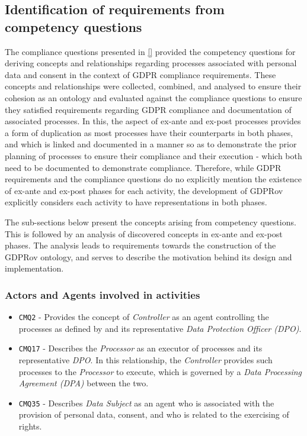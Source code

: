 \subsection{Identification of requirements from competency questions}\label{sec:gdprov:cq}
The compliance questions presented in \autoref{} provided the competency questions for deriving concepts and relationships regarding processes associated with personal data and consent in the context of GDPR compliance requirements. 
These concepts and relationships were collected, combined, and analysed to ensure their cohesion as an ontology and evaluated against the compliance questions to ensure they satisfied requirements regarding GDPR compliance and documentation of associated processes.
In this, the aspect of ex-ante and ex-post processes provides a form of duplication as most processes have their counterparts in both phases, and which is linked and documented in a manner so as to demonstrate the prior planning of processes to ensure their compliance and their execution - which both need to be documented to demonstrate compliance.
Therefore, while GDPR requirements and the compliance questions do no explicitly mention the existence of ex-ante and ex-post phases for each activity, the development of GDPRov explicitly considers each activity to have representations in both phases.

The sub-sections below present the concepts arising from competency questions. 
This is followed by an analysis of discovered concepts in ex-ante and ex-post phases.
The analysis leads to requirements towards the construction of the GDPRov ontology, and serves to describe the motivation behind its design and implementation.

\subsubsection{Actors and Agents involved in activities}
\begin{itemize} 
    \item \texttt{CMQ2} - Provides the concept of \textit{Controller} as an agent controlling the processes as defined by and its representative \textit{Data Protection Officer (DPO)}.
    \item \texttt{CMQ17} - Describes the \textit{Processor} as an executor of processes and its representative \textit{DPO}. In this relationship, the \textit{Controller} provides such processes to the \textit{Processor} to execute, which is governed by a \textit{Data Processing Agreement (DPA)} between the two.
    \item \texttt{CMQ35} - Describes \textit{Data Subject} as an agent who is associated with the provision of personal data, consent, and who is related to the exercising of rights.
\end{itemize}

